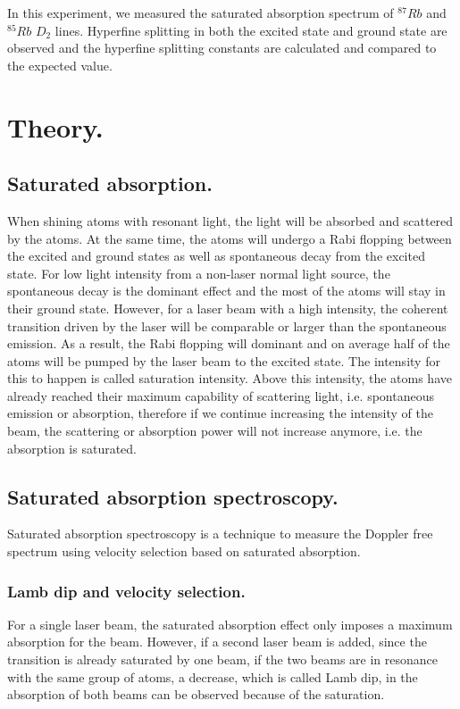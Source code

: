 \documentclass[aps,twocolumn,secnumarabic,balancelastpage,amsmath,amssymb,nofootinbib]{revtex4}
\begin{document}
In this experiment, we measured the saturated absorption spectrum of ${}^{87}Rb$ and ${}^{85}Rb$ $D_2$ lines. Hyperfine splitting in both the excited state and ground state are observed and the hyperfine splitting constants are calculated and compared to the expected value.

\section{Theory.}
\subsection{Saturated absorption.}
When shining atoms with resonant light, the light will be absorbed and scattered by the atoms. At the same time, the atoms will undergo a Rabi flopping between the excited and ground states as well as spontaneous decay from the excited state. For low light intensity from a non-laser normal light source, the spontaneous decay is the dominant effect and the most of the atoms will stay in their ground state. However, for a laser beam with a high intensity, the coherent transition driven by the laser will be comparable or larger than the spontaneous emission. As a result, the Rabi flopping will dominant and on average half of the atoms will be pumped by the laser beam to the excited state. The intensity for this to happen is called saturation intensity. Above this intensity, the atoms have already reached their maximum capability of scattering light, i.e. spontaneous emission or absorption, therefore if we continue increasing the intensity of the beam, the scattering or absorption power will not increase anymore, i.e. the absorption is saturated.

\subsection{Saturated absorption spectroscopy.}
Saturated absorption spectroscopy is a technique to measure the Doppler free spectrum using velocity selection based on saturated absorption.
\subsubsection{Lamb dip and velocity selection.}
For a single laser beam, the saturated absorption effect only imposes a maximum absorption for the beam. However, if a second laser beam is added, since the transition is already saturated by one beam, if the two beams are in resonance with the same group of atoms, a decrease, which is called Lamb dip, in the absorption of both beams can be observed because of the saturation.
\end{document}
